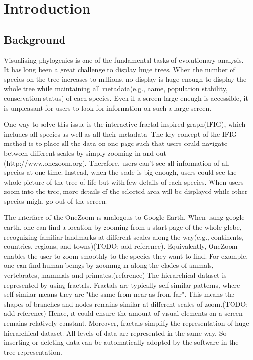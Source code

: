 \documentclass[MSc]{icldt}
\begin{document}
\tableofcontents
\listoftables
\listoffigures

\chapter{Introduction}

\section{Background}

Visualising phylogenies is one of the fundamental tasks of evolutionary analysis. It has long been a great challenge to display huge trees. When the number of species on the tree increases to millions, no display is huge enough to display the whole tree while maintaining all metadata(e.g., name, population stability, conservation status) of each species. Even if a screen large enough is accessible, it is unpleasant for users to look for information on such a large screen. 

One way to solve this issue is the interactive fractal-inspired graph(IFIG), which includes all species as well as all their metadata. The key concept of the IFIG method is to place all the data on one page such that users could navigate between different scales by simply zooming in and out (http://www.onezoom.org). Therefore, users can't see all information of all species at one time. Instead, when the scale is big enough, users could see the whole picture of the tree of life but with few details of each species. When users zoom into the tree, more details of the selected area will be displayed while other species might go out of the screen.

The interface of the OneZoom is analogous to Google Earth. When using google earth, one can find a location by zooming from a start page of the whole globe, recognizing familiar landmarks at different scales along the way(e.g., continents, countries, regions, and towns)(TODO: add reference). Equivalently, OneZoom enables the user to zoom smoothly to the species they want to find. For example, one can find human beings by zooming in along the clades of animals, vertebrates, mammals and primates.(reference) The hierarchical dataset is represented by using fractals. Fractals are typically self similar patterns, where self similar means they are "the same from near as from far". This means the shapes of branches and nodes remains similar at different scales of zoom.(TODO: add reference) Hence, it could ensure the amount of visual elements on a screen remains relatively constant. Moreover, fractals simplify the representation of huge hierarchical dataset. All levels of data are represented in the same way. So inserting or deleting data can be automatically adopted by the software in the tree representation.
\end{document}
